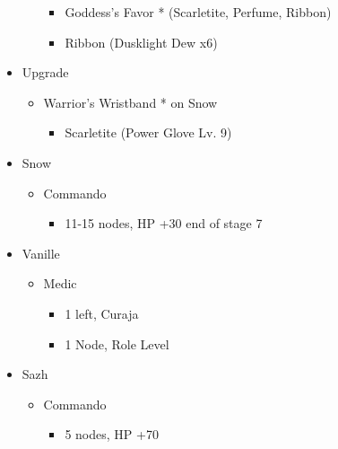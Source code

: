 \begin{paracol}{2}
\begin{upgrade}
\begin{itemize}
\begin{itemize}
\begin{itemize}
				            \item Goddess's Favor * (Scarletite, Perfume, Ribbon)
				            \item Ribbon (Dusklight Dew x6)
			            \end{itemize}
		      \end{itemize}
		\item Upgrade
		      \begin{itemize}
			      \item Warrior's Wristband * on Snow
			            \begin{itemize}
				            \item Scarletite (Power Glove Lv. 9)
			            \end{itemize}
		      \end{itemize}
	\end{itemize}
\end{upgrade}
\switchcolumn*
\begin{menu}
	\begin{itemize}
		\crystarium
		\begin{itemize}
			\item Snow
			      \begin{itemize}
				      \item Commando
				            \begin{itemize}
					            \item 11-15 nodes, HP +30 end of stage 7
				            \end{itemize}
			      \end{itemize}
			\item Vanille
			      \begin{itemize}
				      \item Medic
				            \begin{itemize}
					            \item 1 left, Curaja
					            \item 1 Node, Role Level
				            \end{itemize}
			      \end{itemize}
			\item Sazh
			      \begin{itemize}
				      \item Commando
				            \begin{itemize}
					            \item 5 nodes, HP +70
				            \end{itemize}
			      \end{itemize}

\end{itemize}
\end{itemize}
\end{menu}
\end{paracol}
